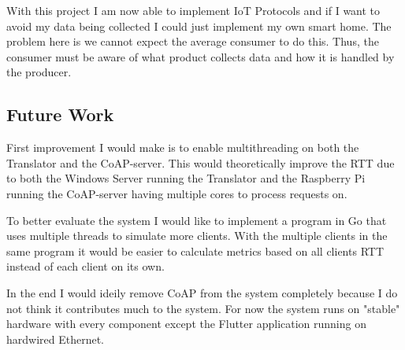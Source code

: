 With this project I am now able to implement IoT Protocols and if I want to avoid my data being collected I could just implement my own smart home. The problem here is we cannot expect the average consumer to do this. Thus, the consumer must be aware of what product collects data and how it is handled by the producer.

\subsection{Future Work}
\label{ch:concl:future-work}
First improvement I would make is to enable multithreading on both the Translator and the CoAP-server. This would theoretically improve the RTT due to both the Windows Server running the Translator and the Raspberry Pi running the CoAP-server having multiple cores to process requests on. 

To better evaluate the system I would like to implement a program in Go that uses multiple threads to simulate more clients. With the multiple clients in the same program it would be easier to calculate metrics based on all clients RTT instead of each client on its own.

In the end I would ideily remove CoAP from the system completely because I do not think it contributes much to the system. For now the system runs on "stable" hardware with every component except the Flutter application running on hardwired Ethernet.